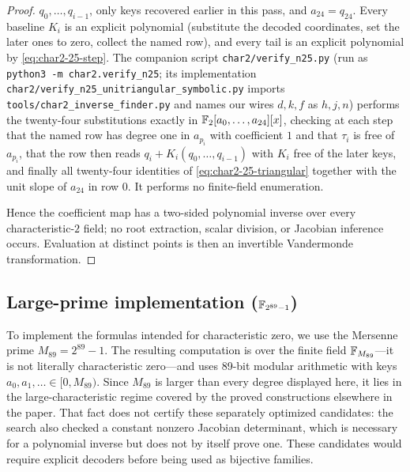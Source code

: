 \begin{proof}
$q_0,\ldots,q_{i-1}$, only keys recovered earlier in this pass, and
$a_{24}=q_{24}$.  Every baseline $K_i$ is an explicit polynomial (substitute
the decoded coordinates, set the later ones to zero, collect the named
row), and every tail is an explicit polynomial by \eqref{eq:char2-25-step}.
The companion script \texttt{char2/verify\_n25.py} (run as
\texttt{python3 -m char2.verify\_n25}; its implementation
\texttt{char2/verify\_n25\_unitriangular\_symbolic.py} imports
\texttt{tools/char2\_inverse\_finder.py} and names our wires $d,k,f$ as
$h,j,n$) performs the twenty-four substitutions exactly in
$\mathbb{F}_2[a_0,\ldots,a_{24}][x]$, checking at each step that the named row has
degree one in $a_{p_i}$ with coefficient $1$ and that $\tau_i$ is free of
$a_{p_i}$, that the row then reads $q_i+K_i(q_0,\ldots,q_{i-1})$ with $K_i$
free of the later keys, and finally all twenty-four identities of
\eqref{eq:char2-25-triangular} together with the unit slope of $a_{24}$ in
row $0$.  It performs no finite-field enumeration.

Hence the coefficient map has a two-sided polynomial inverse over every
characteristic-$2$ field; no root extraction, scalar division, or Jacobian
inference occurs.  Evaluation at distinct points is then an invertible
Vandermonde transformation.
\end{proof}

\subsection{Large-prime implementation (\texorpdfstring{$\mathbb{F}_{2^{89}-1}$}{GF(2\textasciicircum 89-1)})}

To implement the formulas intended for characteristic zero, we use the
Mersenne prime $M_{89}=2^{89}-1$.  The resulting computation is over the
finite field $\mathbb{F}_{M_{89}}$---it is not literally characteristic zero---and
uses 89-bit modular arithmetic with keys
$a_0,a_1,\ldots\in[0,M_{89})$.  Since $M_{89}$ is larger than every degree
displayed here, it lies in the large-characteristic regime covered by the
proved constructions elsewhere in the paper.  That fact does not certify
these separately optimized candidates: the search also checked a constant
nonzero Jacobian determinant, which is necessary for a polynomial inverse but
does not by itself prove one.  These candidates would require explicit
decoders before being used as bijective families.

